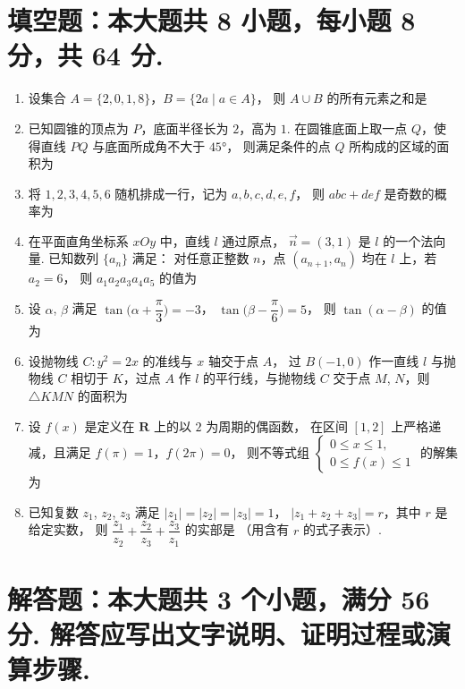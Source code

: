 \documentclass{chsmc}
\begin{document}
\section{填空题：本大题共 8 小题，每小题 8 分，共 64 分.}

\begin{enumerate}
  \item 设集合 $A = \{2, 0, 1, 8\}$，$B = \{2a \mid a \in A\}$，
    则 $A \cup B$ 的所有元素之和是 \blankline
  \item 已知圆锥的顶点为 $P$，底面半径长为 $2$，高为 $1$.
    在圆锥底面上取一点 $Q$，使得直线 $PQ$ 与底面所成角不大于 $45°$，
    则满足条件的点 $Q$ 所构成的区域的面积为 \blankline
  \item 将 $1, 2, 3, 4, 5, 6$ 随机排成一行，记为 $a, b, c, d, e, f$，
    则 $abc + def$ 是奇数的概率为 \blankline
  \item 在平面直角坐标系 $xOy$ 中，直线 $l$ 通过原点，
    $\vec{n} = (3,1)$ 是 $l$ 的一个法向量. 已知数列 $\{a_n\}$ 满足：
    对任意正整数 $n$，点 $(a_{n+1}, a_n)$ 均在 $l$ 上，若 $a_2 = 6$，
    则 $a_1 a_2 a_3 a_4 a_5$ 的值为 \blankline
  \item 设 $\alpha$, $\beta$ 满足
    $\tan\biggl(\alpha + \dfrac{\pi}{3}\biggr) = -3$，
    $\tan\biggl(\beta - \dfrac{\pi}{6}\biggr) = 5$，
    则 $\tan(\alpha - \beta)$ 的值为 \blankline
  \item 设抛物线 $C\colon y^2 = 2x$ 的准线与 $x$ 轴交于点 $A$，
    过 $B(-1,0)$ 作一直线 $l$ 与抛物线 $C$ 相切于 $K$，过点 $A$ 作 $l$
    的平行线，与抛物线 $C$ 交于点 $M$, $N$，则 $\triangle KMN$ 的面积为 \blankline
  \item 设 $f(x)$ 是定义在 $\mathbf{R}$ 上的以 $2$ 为周期的偶函数，
    在区间 $[1,2]$ 上严格递减，且满足 $f(\pi) = 1$，$f(2\pi) = 0$，
    则不等式组
    $\begin{cases}
      0 \leqslant x \leqslant 1, \\
      0 \leqslant f(x) \leqslant 1
    \end{cases}$
    的解集为 \blankline
  \item 已知复数 $z_1$, $z_2$, $z_3$ 满足 $|z_1| = |z_2| = |z_3| = 1$，
    $|z_1 + z_2 + z_3| = r$，其中 $r$ 是给定实数，
    则 $\dfrac{z_1}{z_2} + \dfrac{z_2}{z_3} + \dfrac{z_3}{z_1}$ 的实部是 \blankline
    （用含有 $r$ 的式子表示）.
\end{enumerate}

\section{解答题：本大题共 3 个小题，满分 56 分. 解答应写出文字说明、证明过程或演算步骤.}
\end{document}
